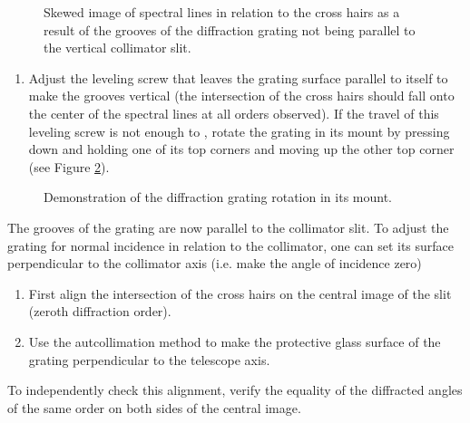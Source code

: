 \documentclass[12pt]{article}
\begin{document}
\begin{figure}[ht!]
    \centering
    \caption{Skewed image of spectral lines in relation to the cross hairs as a result of the grooves of the diffraction grating not being parallel to the vertical collimator slit.}
    \label{Skewed image of spectral lines}
\end{figure}

\begin{enumerate}[resume]
    \item Adjust the leveling screw that leaves the grating surface parallel to itself to make the grooves vertical (the intersection of the cross hairs should fall onto the center of the spectral lines at all orders observed). If the travel of this leveling screw is not enough to , rotate the grating in its mount by pressing down and holding one of its top corners and moving up the other top corner (see Figure \ref{Grating rotation}).
\end{enumerate}

\begin{figure}[ht!]
    \centering
    \caption{Demonstration of the diffraction grating  rotation in its mount.}
    \label{Grating rotation}
\end{figure}

The grooves of the grating are now parallel to the collimator slit. To adjust the grating for normal incidence in relation to the collimator, one can set its surface perpendicular to the collimator axis (i.e. make the angle of incidence zero)
\begin{enumerate}[resume]
    \item First align the intersection of the cross hairs on the central image of the slit (zeroth diffraction order).
    \item Use the autcollimation method to make the protective glass surface of the grating perpendicular to the telescope axis.
\end{enumerate}
To independently check this alignment, verify the equality of the diffracted angles of the same order on both sides of the central image.
\end{document}
